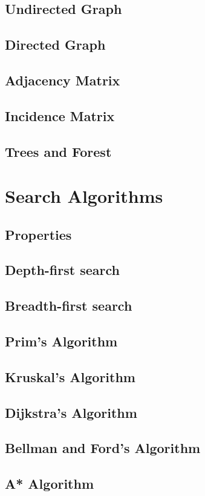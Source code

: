 \subsection{Undirected Graph}

\subsection{Directed Graph}

\subsection{Adjacency Matrix}

\subsection{Incidence Matrix}

\subsection{Trees and Forest}

\section{Search Algorithms}

\subsection{Properties}

\subsection{Depth-first search}

\subsection{Breadth-first search}

\subsection{Prim's Algorithm}

\subsection{Kruskal's Algorithm}

\subsection{Dijkstra's Algorithm}

\subsection{Bellman and Ford's Algorithm}

\subsection{A* Algorithm}

\todo{}
